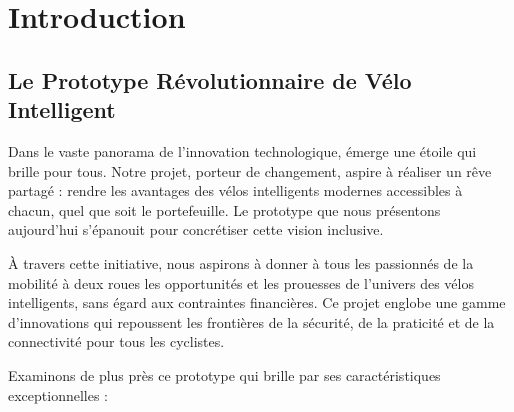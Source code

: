 \chapter*{Introduction}
\section*{Le Prototype Révolutionnaire de Vélo Intelligent}

Dans le vaste panorama de l'innovation technologique, émerge une étoile qui brille pour tous. Notre projet, porteur de changement, aspire à réaliser un rêve partagé : rendre les avantages des vélos intelligents modernes accessibles à chacun, quel que soit le portefeuille. Le prototype que nous présentons aujourd'hui s'épanouit pour concrétiser cette vision inclusive.

À travers cette initiative, nous aspirons à donner à tous les passionnés de la mobilité à deux roues les opportunités et les prouesses de l'univers des vélos intelligents, sans égard aux contraintes financières. Ce projet englobe une gamme d'innovations qui repoussent les frontières de la sécurité, de la praticité et de la connectivité pour tous les cyclistes.

Examinons de plus près ce prototype qui brille par ses caractéristiques exceptionnelles :

